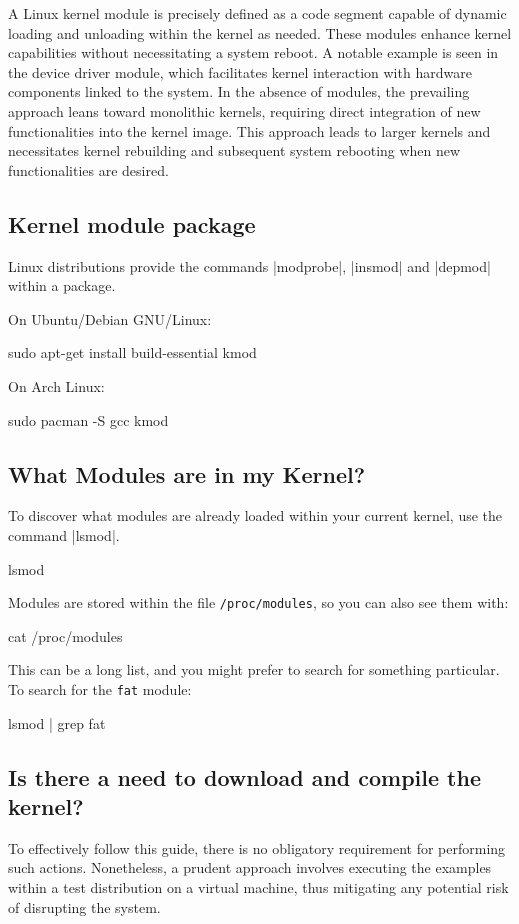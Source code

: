 \documentclass[10pt, oneside]{book}
\begin{document}
A Linux kernel module is precisely defined as a code segment capable of dynamic loading and unloading within the kernel as needed.
These modules enhance kernel capabilities without necessitating a system reboot.
A notable example is seen in the device driver module, which facilitates kernel interaction with hardware components linked to the system.
In the absence of modules, the prevailing approach leans toward monolithic kernels,
requiring direct integration of new functionalities into the kernel image.
This approach leads to larger kernels and necessitates kernel rebuilding and subsequent system rebooting when new functionalities are desired.

\subsection{Kernel module package}
\label{sec:packages}

Linux distributions provide the commands \sh|modprobe|, \sh|insmod| and \sh|depmod| within a package.

On Ubuntu/Debian GNU/Linux:
\begin{codebash}
sudo apt-get install build-essential kmod
\end{codebash}

On Arch Linux:
\begin{codebash}
sudo pacman -S gcc kmod
\end{codebash}

\subsection{What Modules are in my Kernel?}
\label{sec:modutils}

To discover what modules are already loaded within your current kernel, use the command \sh|lsmod|.
\begin{codebash}
lsmod
\end{codebash}

Modules are stored within the file \verb|/proc/modules|, so you can also see them with:
\begin{codebash}
cat /proc/modules
\end{codebash}

This can be a long list, and you might prefer to search for something particular.
To search for the \verb|fat| module:
\begin{codebash}
lsmod | grep fat
\end{codebash}

\subsection{Is there a need to download and compile the kernel?}
\label{sec:buildkernel}
To effectively follow this guide, there is no obligatory requirement for performing such actions.
Nonetheless, a prudent approach involves executing the examples within a test distribution on a virtual machine,
thus mitigating any potential risk of disrupting the system.
\end{document}
